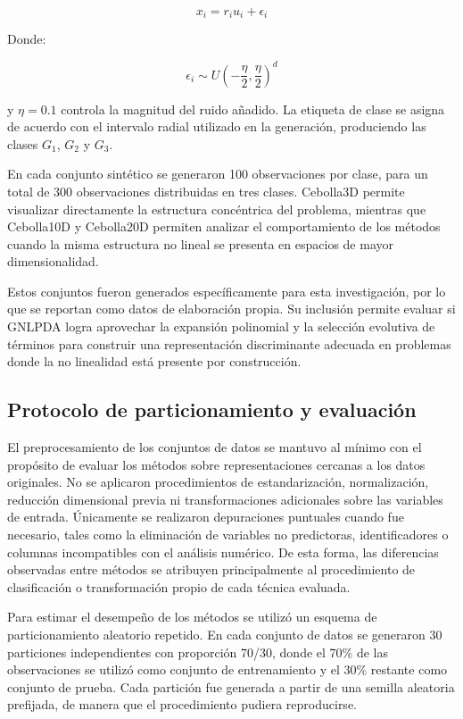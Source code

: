 \begin{equation}
	x_i = r_iu_i + \epsilon_i	
	\label{eq:EM19}
\end{equation}

Donde:

\begin{equation}
	\epsilon_i \sim U\left(-\frac{\eta}{2}, \frac{\eta}{2}\right)^d
	\label{eq:EM20}
\end{equation}

y $\eta = 0.1$ controla la magnitud del ruido añadido. La etiqueta de clase se asigna de acuerdo con el intervalo radial utilizado en la generación, produciendo las clases $G_1$, $G_2$ y $G_3$.

En cada conjunto sintético se generaron 100 observaciones por clase, para un total de 300 observaciones distribuidas en tres clases. Cebolla3D permite visualizar directamente la estructura concéntrica del problema, mientras que Cebolla10D y Cebolla20D permiten analizar el comportamiento de los métodos cuando la misma estructura no lineal se presenta en espacios de mayor dimensionalidad.

Estos conjuntos fueron generados específicamente para esta investigación, por lo que se reportan como datos de elaboración propia. Su inclusión permite evaluar si GNLPDA logra aprovechar la expansión polinomial y la selección evolutiva de términos para construir una representación discriminante adecuada en problemas donde la no linealidad está presente por construcción.

\subsection{Protocolo de particionamiento y evaluación}

El preprocesamiento de los conjuntos de datos se mantuvo al mínimo con el propósito de evaluar los métodos sobre representaciones cercanas a los datos originales. No se aplicaron procedimientos de estandarización, normalización, reducción dimensional previa ni transformaciones adicionales sobre las variables de entrada. Únicamente se realizaron depuraciones puntuales cuando fue necesario, tales como la eliminación de variables no predictoras, identificadores o columnas incompatibles con el análisis numérico. De esta forma, las diferencias observadas entre métodos se atribuyen principalmente al procedimiento de clasificación o transformación propio de cada técnica evaluada.

Para estimar el desempeño de los métodos se utilizó un esquema de particionamiento aleatorio repetido. En cada conjunto de datos se generaron 30 particiones independientes con proporción 70/30, donde el 70\% de las observaciones se utilizó como conjunto de entrenamiento y el 30\% restante como conjunto de prueba. Cada partición fue generada a partir de una semilla aleatoria prefijada, de manera que el procedimiento pudiera
reproducirse.

